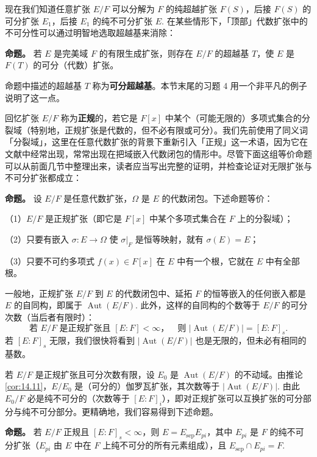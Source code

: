 现在我们知道任意扩张 \(E/F\) 可以分解为 \(F\) 的纯超越扩张 \(F(S)\)，后接 \(F(S)\) 的可分扩张 \(E_1\)，后接 \(E_1\) 的纯不可分扩张 \(E\). 在某些情形下，「顶部」代数扩张中的不可分性可以通过明智地选取超越基来消除：

\noindent\textbf{命题。} 若 \(E\) 是完美域 \(F\) 的有限生成扩张，则存在 \(E/F\) 的超越基 \(T\)，使 \(E\) 是 \(F(T)\) 的可分（代数）扩张。

命题中描述的超越基 \(T\) 称为\textbf{可分超越基}。本节末尾的习题 4 用一个非平凡的例子说明了这一点。

回忆扩张 \(E/F\) 称为\textbf{正规}的，若它是 \(F[x]\) 中某个（可能无限的）多项式集合的分裂域（特别地，正规扩张是代数的，但不必有限或可分）。我们先前使用了同义词「分裂域」，这里在任意代数扩张的背景下重新引入「正规」这一术语，因为它在文献中经常出现，常常出现在把域嵌入代数闭包的情形中。尽管下面这组等价命题可以从前面几节中整理出来，读者应当写出完整的证明，并检查论证对无限扩张与不可分扩张都成立：

\noindent\textbf{命题。} 设 \(E/F\) 是任意代数扩张，\(\Omega\) 是 \(E\) 的代数闭包。下述命题等价：

（1）\(E/F\) 是正规扩张（即它是 \(F[x]\) 中某个多项式集合在 \(F\) 上的分裂域）；

（2）只要有嵌入 \(\sigma : E \to \Omega\) 使 \(\sigma|_F\) 是恒等映射，就有 \(\sigma(E) = E\)；

（3）只要不可约多项式 \(f(x) \in F[x]\) 在 \(E\) 中有一个根，它就在 \(E\) 中有全部根。

一般地，正规扩张 \(E/F\) 到 \(E\) 的代数闭包中、延拓 \(F\) 的恒等嵌入的任何嵌入都是 \(E\) 的自同构，即属于 \(\operatorname{Aut}(E/F)\). 此外，这样的自同构的个数等于 \(E/F\) 的可分次数（当后者有限时）：
\[
\text{若 } E/F \text{ 是正规扩张且 } [E:F] < \infty， \quad \text{则 } |\operatorname{Aut}(E/F)| = [E:F]_s.
\]
若 \([E:F]_s\) 无限，我们很快将看到 \(|\operatorname{Aut}(E/F)|\) 也是无限的，但未必有相同的基数。

若 \(E/F\) 是正规扩张且可分次数有限，设 \(E_0\) 是 \(\operatorname{Aut}(E/F)\) 的不动域。由推论 \ref{cor:14.11}，\(E/E_0\) 是（可分的）伽罗瓦扩张，其次数等于 \(|\operatorname{Aut}(E/F)|\). 由此 \(E_0/F\) 必是纯不可分的（次数等于 \([E:F]_i\)），即对正规扩张可以互换扩张的可分部分与纯不可分部分。更精确地，我们容易得到下述命题。

\noindent\textbf{命题。} 若 \(E/F\) 正规且 \([E:F]_s < \infty\)，则 \(E = E_{\mathrm{sep}}E_{pi}\)，其中 \(E_{pi}\) 是 \(F\) 的纯不可分扩张（\(E_{pi}\) 由 \(E\) 中在 \(F\) 上纯不可分的所有元素组成），且 \(E_{\mathrm{sep}} \cap E_{pi} = F\).

